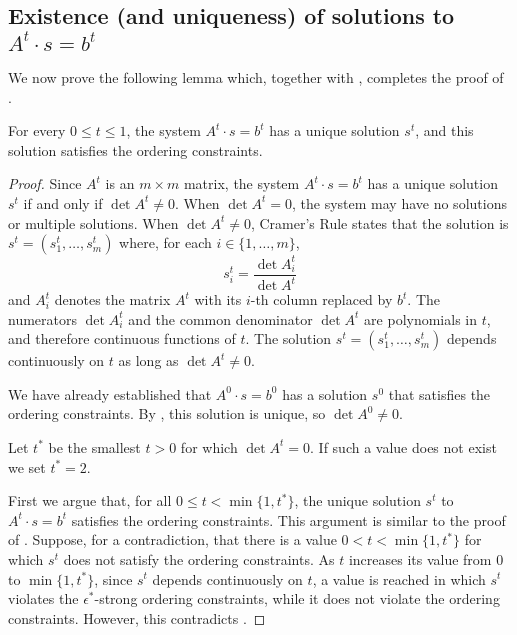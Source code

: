 \subsection{Existence (and uniqueness) of solutions to $A^t\cdot s=b^t$}

We now prove the following lemma which, together with , completes the proof of .

\begin{lem}
	For every $0\le t\le 1$, the system $A^t\cdot s=b^t$ has a
	unique solution $s^t$, and this solution satisfies the ordering
	constraints.
\end{lem}

\begin{proof}
	Since $A^t$ is an $m\times m$ matrix, the system $A^t\cdot
	s=b^t$ has a unique solution~$s^t$ if and only if $\det A^t \neq 0$.
	When $\det A^t =0$, the system may have no solutions or
	multiple solutions.  
	When $\det A^t\neq 0$, 
	Cramer's Rule states that
	the solution
	is $s^t=(s_1^t,\ldots,s_m^t)$ where, for each
	$i\in\{1,\ldots,m\}$,
	\[ 
	s_i^t = \frac{\det A^t_i}{\det A^t }
	\]
	and $A^t_i$ denotes the matrix $A^t$ with its $i$-th column replaced
	by $b^t$. 
	The numerators $\det A^t_i$ and the common
	denominator $\det A^t $ are polynomials in $t$, and therefore
	continuous
	functions of $t$.
	The solution $s^t=(s_1^t,\ldots,s_m^t)$ depends continuously on $t$
	as long as  $\det A^t\ne0 $.
	
	We have already established that $A^0\cdot s=b^0$ has a
	solution $s^0$ that satisfies the ordering constraints. By
	, this solution is unique, so $\det A^0\neq 0$.
	
	Let $t^*$ be the smallest $t>0$
	for which 
	$\det A^{t}= 0$. If such a value does not exist we set $t^*=2$.
	
	First we argue that, for all $0\le t <\min \{1,t^*\}$, the unique solution $s^t$ to $A^t\cdot s=b^t$ satisfies the ordering constraints. This argument is similar to the proof of . Suppose, for a contradiction, that there is a value $0<t<\min\{1,t^*\}$ for which $s^t$ does not satisfy the ordering constraints. As $t$ increases its value from $0$ to $\min\{1,t^*\}$, since $s^t$ depends continuously on $t$, a value is reached in which $s^t$ violates the $\epsilon^*$-strong ordering constraints, while it does not violate the ordering constraints. However, this contradicts	.
	

\end{proof}
